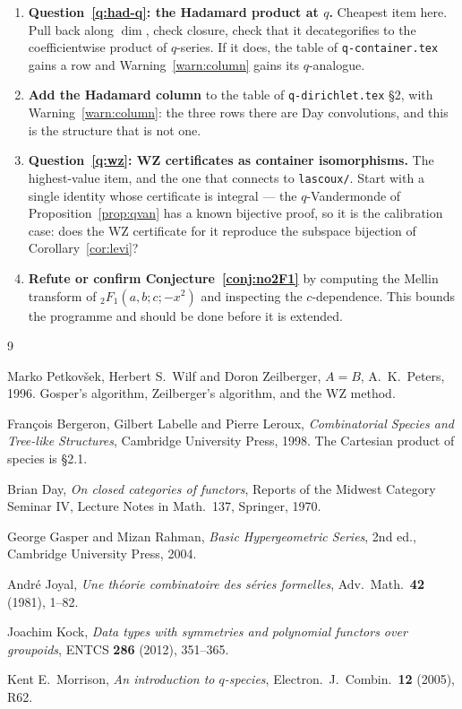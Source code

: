 \documentclass[11pt,a4paper]{article}
\theoremstyle{definition}
\theoremstyle{remark}
\begin{document}
\begin{enumerate}[nosep]
  \item \textbf{Question~\ref{q:had-q}: the Hadamard product at $q$.} Cheapest item
        here. Pull back along $\dim$, check closure, check that it decategorifies to
        the coefficientwise product of $q$-series. If it does, the table of
        \texttt{q-container.tex} gains a row and Warning~\ref{warn:column} gains its
        $q$-analogue.
  \item \textbf{Add the Hadamard column} to the table of \texttt{q-dirichlet.tex}
        \S2, with Warning~\ref{warn:column}: the three rows there are Day
        convolutions, and this is the structure that is not one.
  \item \textbf{Question~\ref{q:wz}: WZ certificates as container isomorphisms.}
        The highest-value item, and the one that connects to \texttt{lascoux/}. Start
        with a single identity whose certificate is integral --- the $q$-Vandermonde
        of Proposition~\ref{prop:qvan} has a known bijective proof, so it is the
        calibration case: does the WZ certificate for it reproduce the subspace
        bijection of Corollary~\ref{cor:levi}?
  \item \textbf{Refute or confirm Conjecture~\ref{conj:no2F1}} by computing the
        Mellin transform of ${}_2F_1(a,b;c;-x^2)$ and inspecting the
        $c$-dependence. This bounds the programme and should be done before it is
        extended.
\end{enumerate}

\begin{thebibliography}{9}

 Marko Petkov\v{s}ek, Herbert S.\ Wilf and Doron Zeilberger,
\emph{$A=B$}, A.\ K.\ Peters, 1996. Gosper's algorithm, Zeilberger's algorithm, and
the WZ method.

 Fran\c{c}ois Bergeron, Gilbert Labelle and Pierre Leroux,
\emph{Combinatorial Species and Tree-like Structures}, Cambridge University Press,
1998. The Cartesian product of species is \S2.1.

 Brian Day, \emph{On closed categories of functors}, Reports of the
Midwest Category Seminar IV, Lecture Notes in Math.\ 137, Springer, 1970.

 George Gasper and Mizan Rahman, \emph{Basic Hypergeometric
Series}, 2nd ed., Cambridge University Press, 2004.

 Andr\'e Joyal, \emph{Une th\'eorie combinatoire des s\'eries
formelles}, Adv.\ Math.\ \textbf{42} (1981), 1--82.

 Joachim Kock, \emph{Data types with symmetries and polynomial functors
over groupoids}, ENTCS \textbf{286} (2012), 351--365.

 Kent E.\ Morrison, \emph{An introduction to $q$-species},
Electron.\ J.\ Combin.\ \textbf{12} (2005), R62.

\end{thebibliography}
\end{document}

